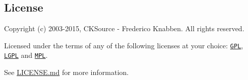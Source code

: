 \subsection*{License }

Copyright (c) 2003-\/2015, C\+K\+Source -\/ Frederico Knabben. All rights reserved.

Licensed under the terms of any of the following licenses at your choice\+: \href{http://www.gnu.org/licenses/gpl.html}{\tt G\+P\+L}, \href{http://www.gnu.org/licenses/lgpl.html}{\tt L\+G\+P\+L} and \href{http://www.mozilla.org/MPL/MPL-1.1.html}{\tt M\+P\+L}.

See \hyperlink{LICENSE_8md}{L\+I\+C\+E\+N\+S\+E.\+md} for more information. 